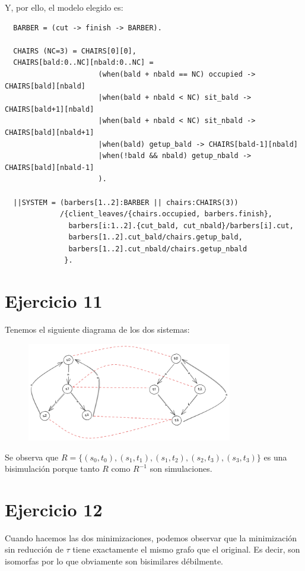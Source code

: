 \documentclass{article}
\begin{document}
Y, por ello, el modelo elegido es:
\begin{verbatim}
  BARBER = (cut -> finish -> BARBER).

  CHAIRS (NC=3) = CHAIRS[0][0],
  CHAIRS[bald:0..NC][nbald:0..NC] =
                      (when(bald + nbald == NC) occupied -> CHAIRS[bald][nbald]
                      |when(bald + nbald < NC) sit_bald -> CHAIRS[bald+1][nbald]
                      |when(bald + nbald < NC) sit_nbald -> CHAIRS[bald][nbald+1]
                      |when(bald) getup_bald -> CHAIRS[bald-1][nbald]
                      |when(!bald && nbald) getup_nbald -> CHAIRS[bald][nbald-1]
                      ).

  ||SYSTEM = (barbers[1..2]:BARBER || chairs:CHAIRS(3))
             /{client_leaves/{chairs.occupied, barbers.finish},
               barbers[i:1..2].{cut_bald, cut_nbald}/barbers[i].cut,
               barbers[1..2].cut_bald/chairs.getup_bald,
               barbers[1..2].cut_nbald/chairs.getup_nbald
              }.
\end{verbatim}

\pagebreak
\section*{Ejercicio 11}
Tenemos el siguiente diagrama de los dos sistemas:
\begin{figure}[ht]
	\includegraphics[width=0.8\textwidth]{02-11.png}
	\centering
\end{figure}

Se observa que $R = \{(s_0, t_0), (s_1, t_1), (s_1, t_2), (s_2, t_3), (s_3, t_3)\}$ es una bisimulación porque tanto $R$ como $R^{-1}$ son simulaciones.

\section*{Ejercicio 12}
Cuando hacemos las dos minimizaciones, podemos observar que la minimización sin reducción de $\tau$ tiene exactamente el mismo grafo que el original.
Es decir, son isomorfas por lo que obviamente son bisimilares débilmente.
\end{document}
